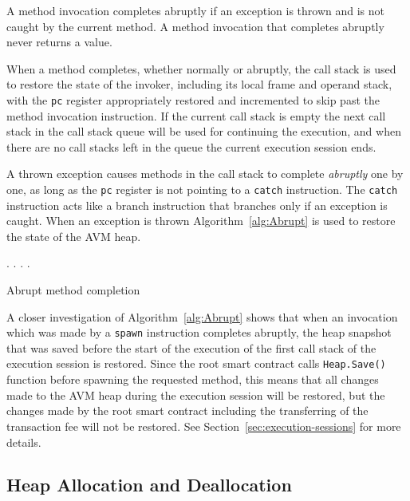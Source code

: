 A method invocation completes abruptly if an exception is thrown and is not caught by the current method. A
method invocation that completes abruptly never returns a value.

When a method completes, whether normally or abruptly, the call stack is used to restore the state of the invoker,
including its local frame and operand stack, with the \texttt{pc} register appropriately restored and incremented
to skip past the method invocation instruction. If the current call stack is empty the next call stack in the call
stack queue will be used for continuing the execution, and when there are no call stacks left in the queue the
current execution session ends.

A thrown exception causes methods in the call stack to complete \emph{abruptly} one by one, as long as the
\texttt{pc} register is not pointing to a \texttt{catch} instruction. The \texttt{catch} instruction acts like a
branch instruction that branches only if an exception is caught. When an exception is thrown
Algorithm~\ref{alg:Abrupt} is used to restore the state of the AVM heap.

\begin{algorithm}
    \DontPrintSemicolon

    {
        \Stack.\Pop{}\;
        {
            \Heap.\Restore{}\;
        }{
            \Heap.\Discard{}\;
        }
    }
    \Heap.\Restore{}\;
    \caption{Abrupt method completion}\label{alg:Abrupt}
\end{algorithm}

A closer investigation of Algorithm~\ref{alg:Abrupt} shows that when an invocation which was made by
a \texttt{spawn} instruction completes abruptly, the heap snapshot that was saved before the start of the
execution of the first call stack of the execution session is restored. Since the root
smart contract calls \texttt{Heap.Save()} function before spawning the requested method, this means
that all changes made to the AVM heap during the execution session will be restored, but the changes made by
the root smart contract including the transferring of the transaction fee will not be restored. See
Section~\ref{sec:execution-sessions} for more details.


\subsection{Heap Allocation and Deallocation}\label{subsec:heap-allocation-instructions}

